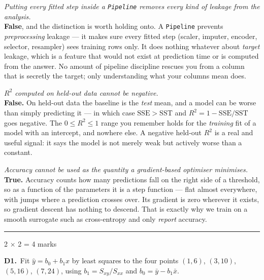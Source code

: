 \documentclass[10pt,a4paper]{article}
\newcommand{\parthead}[2]{\vspace{2pt}\noindent\rule{\linewidth}{0.4pt}\par\vspace{2pt}%
  \noindent{\bfseries Part #1}\hfill{\small #2}\par\vspace{1pt}}
\begin{document}
\begin{sC}

  \item \emph{Putting every fitted step inside a \texttt{Pipeline} removes every kind of leakage from the analysis.}\\[2pt] \textbf{False}, and the distinction is worth holding onto. A \texttt{Pipeline} prevents \emph{preprocessing} leakage --- it makes sure every fitted step (scaler, imputer, encoder, selector, resampler) sees training rows only. It does nothing whatever about \emph{target} leakage, which is a feature that would not exist at prediction time or is computed from the answer. No amount of pipeline discipline rescues you from a column that is secretly the target; only understanding what your columns mean does.

  \item \emph{$R^2$ computed on held-out data cannot be negative.}\\[2pt] \textbf{False.} On held-out data the baseline is the \emph{test} mean, and a model can be worse than simply predicting it --- in which case $\mathrm{SSE} > \mathrm{SST}$ and $R^2 = 1 - \mathrm{SSE}/\mathrm{SST}$ goes negative. The $0 \le R^2 \le 1$ range you remember holds for the \emph{training} fit of a model with an intercept, and nowhere else. A negative held-out $R^2$ is a real and useful signal: it says the model is not merely weak but actively worse than a constant.

  \item \emph{Accuracy cannot be used as the quantity a gradient-based optimiser minimises.}\\[2pt] \textbf{True.} Accuracy counts how many predictions fall on the right side of a threshold, so as a function of the parameters it is a step function --- flat almost everywhere, with jumps where a prediction crosses over. Its gradient is zero wherever it exists, so gradient descent has nothing to descend. That is exactly why we train on a smooth surrogate such as cross-entropy and only \emph{report} accuracy.

\end{sC}

\newpage

\parthead{D --- Short answer}{2 $\times$ 2 = 4 marks}

\textbf{D1.}\ Fit $\hat y = b_0 + b_1 x$ by least squares to the four points $(1,6)$, $(3,10)$, $(5,16)$, $(7,24)$, using $b_1 = S_{xy}/S_{xx}$ and $b_0 = \bar y - b_1 \bar x$.
\end{document}
